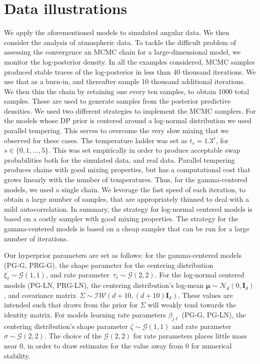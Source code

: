 \section{Data illustrations\label{sec:results}} 
We apply the aforementioned models to simulated angular data. We then consider the analysis
    of atmospheric data. To tackle the difficult problem of assessing the convergence 
    an MCMC chain for a large-dimensional model, we monitor the log-posterior 
    density. In all the examples considered, MCMC samples produced stable traces of the
    log-posterior in less than 40 thousand  iterations. We use that as a burn-in, 
    and thereafter sample 10 thousand additional iterations. We then thin the chain by retaining one
    every ten samples, to obtain 1000 total samples. These are used to generate samples from the 
    posterior predictive densities. We used two different strategies to implement the MCMC samplers.
    For the models whose DP prior is centered around a log-normal distribution we used parallel 
    tempering. This serves to overcome the very slow mixing that we observed for these cases.
    The temperature ladder was set as $t_s = 1.3^{s}$,  for $s \in \lbrace0,1,\ldots,5\rbrace$. This was 
    set empirically in order to produce acceptable swap probabilities both for the simulated data, 
    and real data. Parallel tempering produces chains with good mixing properties, but has a 
    computational cost that  grows linearly with the number of temperatures. Thus, for the 
    gamma-centered models, we used a single chain. We leverage the fast speed of each iteration, 
    to obtain a large number of samples, that are appropriately thinned to deal with a mild
    autocorrelation. In summary, the strategy for log-normal centered models is based on a costly
    sampler with good mixing properties. The strategy for the gamma-centered models is based on
    a cheap sampler that can be run for a large number of iterations.

Our hyperprior parameters are set as follows: for the gamma-centered models (PG-G, PRG-G), 
    the shape parameter for the centering 
    distribution~$\xi_{\ell}\sim \mathcal{G}\left(1,1\right)$, and
    rate parameter~$\tau_{\ell}\sim\mathcal{G}\left(2,2\right)$.
    For the log-normal centered models (PG-LN, PRG-LN), the centering distribution's
    log-mean $\bm{\mu}\sim\mathcal{N}_d\left(0,\bm{I}_d\right)$, and covariance 
    matrix~$\Sigma\sim\mathcal{IW}\left(d + 10, (d+10)\bm{I}_{d}\right)$.  These values are 
    intended such that draws from the prior for $\Sigma$ will weakly tend towards the 
    identity matrix.
    For models learning rate parameters $\beta_{j\ell}$ (PG-G, PG-LN), the centering
    distribution's shape parameter $\zeta\sim\mathcal{G}\left(1,1\right)$ and rate parameter
    $\sigma\sim\mathcal{G}\left(2,2\right)$.  The choice of the $\mathcal{G}(2,2)$ for rate
    parameters places little mass near 0, in order to draw estimates for the value away from 
    0 for numerical stability.

